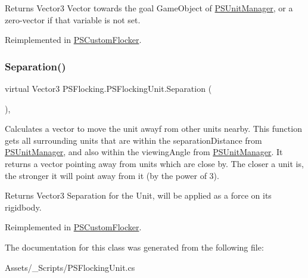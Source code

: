 \begin{DoxyReturn}{Returns}
Vector3 Vector towards the goal Game\+Object of \hyperlink{class_p_s_flocking_1_1_p_s_unit_manager}{P\+S\+Unit\+Manager}, or a zero-\/vector if that variable is not set. 
\end{DoxyReturn}


Reimplemented in \hyperlink{class_p_s_custom_flocker_a43590dd2fdf5f37d2116cf08473375c7}{P\+S\+Custom\+Flocker}.

\mbox{\label{class_p_s_flocking_1_1_p_s_flocking_unit_af486901d480a5520aeae135d46635e60}} 
\subsubsection{\texorpdfstring{Separation()}{Separation()}}
{\footnotesize\ttfamily virtual Vector3 P\+S\+Flocking.\+P\+S\+Flocking\+Unit.\+Separation (\begin{DoxyParamCaption}{ }\end{DoxyParamCaption})\hspace{0.3cm}{\ttfamily [protected]}, {\ttfamily [virtual]}}



Calculates a vector to move the unit awayf rom other units nearby. This function gets all surrounding units that are within the separation\+Distance from \hyperlink{class_p_s_flocking_1_1_p_s_unit_manager}{P\+S\+Unit\+Manager}, and also within the viewing\+Angle from \hyperlink{class_p_s_flocking_1_1_p_s_unit_manager}{P\+S\+Unit\+Manager}. It returns a vector pointing away from units which are close by. The closer a unit is, the stronger it will point away from it (by the power of 3). 

\begin{DoxyReturn}{Returns}
Vector3 Separation for the Unit, will be applied as a force on its rigidbody. 
\end{DoxyReturn}


Reimplemented in \hyperlink{class_p_s_custom_flocker_a2ab0990e603a5102fc80dafee1333c7c}{P\+S\+Custom\+Flocker}.



The documentation for this class was generated from the following file\+:\begin{DoxyCompactItemize}
\item 
Assets/\+\_\+\+Scripts/P\+S\+Flocking\+Unit.\+cs\end{DoxyCompactItemize}
